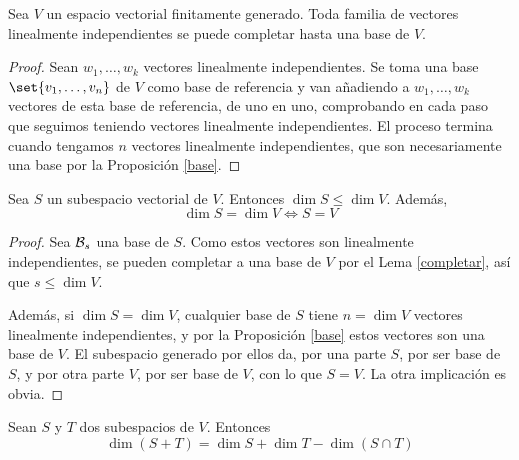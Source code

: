 \begin{lemma}
	\label{completar}
	Sea \(V \) un espacio vectorial finitamente generado. Toda familia de vectores linealmente independientes se puede completar hasta una base de \(V \).
\end{lemma}
\begin{proof}
	Sean \(w_1, \ldots, w_k \) vectores linealmente independientes. Se toma una base \(\set{v_1, \ldots, v_n }\) de \(V \) como base de referencia y van añadiendo a \(w_1, \ldots, w_k \) vectores de esta base de referencia, de uno en uno, comprobando en cada paso que seguimos teniendo vectores linealmente independientes. El proceso termina cuando tengamos \(n \) vectores linealmente independientes, que son necesariamente una base por la Proposición \ref{base}.
\end{proof}
\begin{corollary}
	Sea \(S \) un subespacio vectorial de \(V \). Entonces \(\dim S \leq \dim V \). Además,
	\[
		\dim S = \dim V \Leftrightarrow S = V
	\]
\end{corollary}
\begin{proof}
	Sea \(\mathcal{\MakeUppercase{b}}_s \) una base de \(S \). Como estos vectores son linealmente independientes, se pueden completar a una base de \(V \) por el Lema \ref{completar}, así que \(s \leq \dim V \).

	Además, si \(\dim S = \dim V \), cualquier base de \(S \) tiene \(n = \dim V\) vectores linealmente independientes, y por la Proposición \ref{base} estos vectores son una base de \(V \). El subespacio generado por ellos da, por una parte \(S \), por ser base de \(S \), y por otra parte \(V \), por ser base de \(V \), con lo que \(S = V \). La otra implicación es obvia.
\end{proof}
\begin{theorem}
	Sean \(S \) y \(T \) dos subespacios de \(V \). Entonces
	\[
		\dim (S + T) = \dim S + \dim T - \dim (S \cap T )
	\]
\end{theorem}
